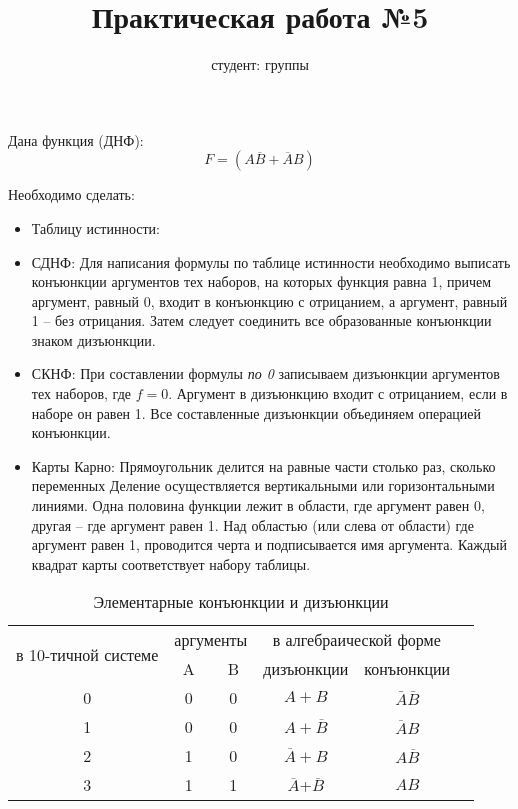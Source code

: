 \documentclass{article}
\title{Практическая работа №5}
\author{студент:    группы    }
\begin{document}
\maketitle
Дана функция (ДНФ):
$$
F=(A\overline{B} + \overline{A}B)
$$

Необходимо сделать: 
\begin{itemize}
\item Таблицу истинности:
\item СДНФ: Для написания формулы по таблице истинности необходимо выписать конъюнкции 
аргументов тех наборов, на которых функция равна 1, причем аргумент, равный 0, входит 
в конъюнкцию с отрицанием, а аргумент, равный 1 -- без отрицания. Затем следует соединить
все образованные конъюнкции знаком дизъюнкции.
\item СКНФ: При составлении формулы {\it по 0} записываем дизъюнкции аргументов тех 
наборов, где $f=0$. Аргумент в дизъюнкцию входит с отрицанием, если в наборе он равен 1. 
Все составленные дизъюнкции объединяем операцией конъюнкции.
\item Карты Карно: Прямоугольник делится на равные части столько раз, сколько переменных 
Деление осуществляется вертикальными или горизонтальными линиями. Одна половина функции 
лежит в области, где аргумент равен 0, другая -- где аргумент равен 1. Над областью (или 
слева от области) где аргумент равен 1, проводится черта и подписывается имя аргумента. 
Каждый квадрат карты соответствует набору таблицы.
\end{itemize}


\begin{table}[ht]
  \centering%
\begin{tabular}{@{} cccccc @{}}
\toprule
\multirow{2}{*}{в 10-тичной системе} &\multicolumn{2}{|c|}{аргументы}& 
\multicolumn{2}{|c|}{в алгебраической форме}\\
\cmidrule{2-5}&
\multicolumn{1}{|c|}{A}& \multicolumn{1}{|c|}{B}& \multicolumn{1}{|c|}{дизъюнкции}& 
\multicolumn{1}{|c|}{конъюнкции}\\
\midrule 
0 & 0 & 0 &  $A+B$ & $\bar{A}\bar{B}$ \\
1 & 0 & 0 &  $A+\overline{B}$ & $\overline{A}B$\\
2 & 1 & 0 &  $\overline{A}+B$ & $A\overline{B}$\\
3 & 1 & 1 & $\overline{A}$+$\overline{B}$ & $AB$ \\ 
\bottomrule
\end{tabular}
\caption{Элементарные конъюнкции и дизъюнкции}\label{tab:table_init}
\end{table} 
\end{document}
